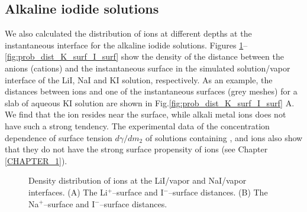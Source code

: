 \subsection{Alkaline iodide solutions}
We also calculated the distribution of ions at different depths at the instantaneous interface for the alkaline iodide solutions.
Figures \ref{fig:prob_dist_Li_surf_I_surf}--\ref{fig:prob_dist_K_surf_I_surf} show the density of the distance between the anions (cations) 
and the instantaneous surface in the simulated solution/vapor interface of the LiI, NaI and KI solution, respectively. 
As an example, the distances between ions and one of the instantaneous surfaces (grey meshes) 
for a slab of aqueous KI solution are shown in Fig.\thinspace\ref{fig:prob_dist_K_surf_I_surf} A. 
We find that the \I ion resides near the surface, while alkali metal ions does not have such a strong tendency. 
The experimental data of the concentration dependence of surface tension $d\gamma/dm_2$ of solutions 
containing \Li, \Na and \K ions also show that they do not have the strong surface propensity of \I ions (see Chapter \thinspace\ref{CHAPTER_1}).
\begin{figure}[H]%
    \centering
    \qquad
    \caption{
Density distribution of ions at the LiI/vapor and NaI/vapor interfaces.   
(A) 
The Li$^+$--surface and I$^-$--surface distances. 
(B)
The Na$^+$--surface and I$^-$--surface distances. 
}%
    \label{fig:prob_dist_Li_surf_I_surf}%
\end{figure}
